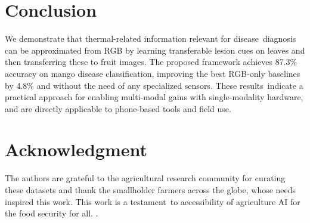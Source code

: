 \documentclass[conference]{IEEEtran}
\begin{document}
\section{Conclusion}
We demonstrate that thermal-related information relevant for disease diagnosis can be approximated from RGB by learning transferable lesion cues on leaves and then transferring these to fruit images. The proposed framework achieves 87.3\% accuracy on mango disease classification, improving the best RGB-only baselines by 4.8\% and without the need of any specialized sensors. These results indicate a practical approach for enabling multi-modal gains with single-modality hardware, and are directly applicable to phone-based tools and field use. 

\section*{Acknowledgment}

The authors are grateful to the agricultural research community for curating these datasets and thank the smallholder farmers across the globe, whose needs inspired this work. This work is a testament to accessibility of agriculture AI for the food security for all. .
\end{document}

